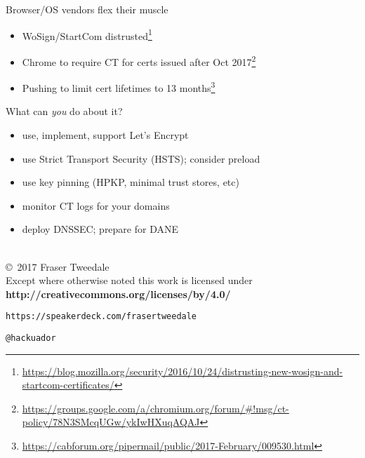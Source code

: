 \documentclass[ignorenonframetext,aspectratio=169]{beamer}
\begin{document}
\begin{frame}{Browser/OS vendors flex their muscle}

\begin{itemize}
\item WoSign/StartCom distrusted\footnote[frame]{
  \url{https://blog.mozilla.org/security/2016/10/24/distrusting-new-wosign-and-startcom-certificates/}}
\item Chrome to require CT for certs issued after Oct 2017\footnote[frame]{
  \url{https://groups.google.com/a/chromium.org/forum/\#!msg/ct-policy/78N3SMcqUGw/ykIwHXuqAQAJ}}
\item Pushing to limit cert lifetimes to 13 months\footnote{
  \url{https://cabforum.org/pipermail/public/2017-February/009530.html}}
\end{itemize}

\end{frame}

\begin{frame}{What can \emph{you} do about it?}

\begin{itemize}
\item
  use, implement, support Let's Encrypt
\item
  use Strict Transport Security (HSTS); consider preload
\item
  use key pinning (HPKP, minimal trust stores, etc)
\item
  monitor CT logs for your domains
\item
  deploy DNSSEC; prepare for DANE
\end{itemize}

\end{frame}

\begin{frame}[plain]




    \setlength{\parskip}{.5em}

    { \centering

    
    \\
    \copyright~2017  Fraser Tweedale
    \\
    { \scriptsize
    Except where otherwise noted this work is licensed under
    }\\
    { \footnotesize
    \textbf{http://creativecommons.org/licenses/by/4.0/}
    }

    \bigskip
    \Large

    \texttt{https://speakerdeck.com/frasertweedale}

    \texttt{@hackuador}

    }


\end{frame}
\end{document}
